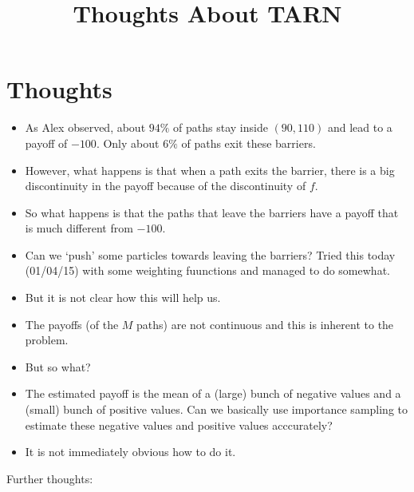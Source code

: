 \documentclass{article}
\begin{document}
\title{Thoughts About TARN}
\maketitle

\section{Thoughts}

\begin{itemize}

\item As Alex observed, about $94\%$ of paths stay inside $(90,110)$ and lead to a payoff of $-100$. Only about $6\%$ of paths exit these barriers.

\item However, what happens is that when a path exits the barrier, there is a big discontinuity in the payoff because of the discontinuity of $f$. 

\item So what happens is that the paths that leave the barriers have a payoff that is much different from $-100$.

\item Can we `push' some particles towards leaving the barriers? Tried this today (01/04/15) with some weighting fuunctions and managed to do somewhat.

\item But it is not clear how this will help us. 

\item The payoffs (of the $M$ paths) are not continuous and this is inherent to the problem.

\item But so what?

\item The estimated payoff is the mean of a (large) bunch of negative values and a (small) bunch of positive values. Can we basically use importance sampling to estimate these negative values and positive values acccurately? 

\item It is not immediately obvious how to do it. 

\end{itemize} 
Further thoughts:
\end{document}

